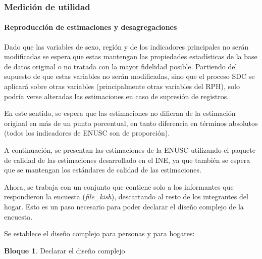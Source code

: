 \documentclass[]{book}
\let\oldparagraph\paragraph
\renewcommand{\paragraph}[1]{\oldparagraph{#1}\mbox{}}
\theoremstyle{definition}
\theoremstyle{definition}
\newtheorem{example}{Bloque}[chapter]
\theoremstyle{definition}
\theoremstyle{definition}
\theoremstyle{remark}
\begin{document}
\hypertarget{mediciuxf3n-de-utilidad}{%
\subsubsection{Medición de utilidad}\label{mediciuxf3n-de-utilidad}}

\hypertarget{reproducciuxf3n-de-estimaciones-y-desagregaciones}{%
\paragraph{Reproducción de estimaciones y desagregaciones}\label{reproducciuxf3n-de-estimaciones-y-desagregaciones}}

Dado que las variables de sexo, región y de los indicadores principales no serán modificadas se espera que estas mantengan las propiedades estadísticas de la base de datos original o no tratada con la mayor fidelidad posible. Partiendo del supuesto de que estas variables no serán modificadas, sino que el proceso SDC se aplicará sobre otras variables (principalmente otras variables del RPH), solo podría verse alteradas las estimaciones en caso de supresión de registros.

En este sentido, se espera que las estimaciones no difieran de la estimación original en más de un punto porcentual, en tanto diferencia en términos absolutos (todos los indicadores de ENUSC son de proporción).

A continuación, se presentan las estimaciones de la ENUSC utilizando el paquete de calidad de las estimaciones desarrollado en el INE, ya que también se espera que se mantengan los estándares de calidad de las estimaciones.

Ahora, se trabaja con un conjunto que contiene solo a los informantes que respondieron la encuesta (\emph{file\_kish}), descartando al resto de los integrantes del hogar. Esto es un paso necesario para poder declarar el diseño complejo de la encuesta.

Se establece el diseño complejo para personas y para hogares:

\begin{example}
\protect\hypertarget{exm:bloque9nbm}{}{\label{exm:bloque9nbm} }Declarar el diseño complejo
\end{example}
\end{document}
